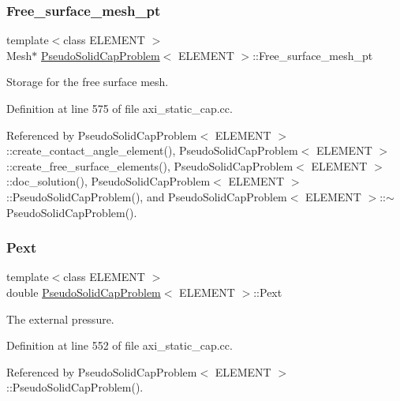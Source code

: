 \subsubsection{\texorpdfstring{Free\+\_\+surface\+\_\+mesh\+\_\+pt}{Free\_surface\_mesh\_pt}}
{\footnotesize\ttfamily template$<$class E\+L\+E\+M\+E\+NT $>$ \\
Mesh$\ast$ \hyperlink{classPseudoSolidCapProblem}{Pseudo\+Solid\+Cap\+Problem}$<$ E\+L\+E\+M\+E\+NT $>$\+::Free\+\_\+surface\+\_\+mesh\+\_\+pt\hspace{0.3cm}{\ttfamily [private]}}



Storage for the free surface mesh. 



Definition at line 575 of file axi\+\_\+static\+\_\+cap.\+cc.



Referenced by Pseudo\+Solid\+Cap\+Problem$<$ E\+L\+E\+M\+E\+N\+T $>$\+::create\+\_\+contact\+\_\+angle\+\_\+element(), Pseudo\+Solid\+Cap\+Problem$<$ E\+L\+E\+M\+E\+N\+T $>$\+::create\+\_\+free\+\_\+surface\+\_\+elements(), Pseudo\+Solid\+Cap\+Problem$<$ E\+L\+E\+M\+E\+N\+T $>$\+::doc\+\_\+solution(), Pseudo\+Solid\+Cap\+Problem$<$ E\+L\+E\+M\+E\+N\+T $>$\+::\+Pseudo\+Solid\+Cap\+Problem(), and Pseudo\+Solid\+Cap\+Problem$<$ E\+L\+E\+M\+E\+N\+T $>$\+::$\sim$\+Pseudo\+Solid\+Cap\+Problem().

\mbox{\label{classPseudoSolidCapProblem_afbcfe3a5a05d191c44815681e4b621d0}} 
\subsubsection{\texorpdfstring{Pext}{Pext}}
{\footnotesize\ttfamily template$<$class E\+L\+E\+M\+E\+NT $>$ \\
double \hyperlink{classPseudoSolidCapProblem}{Pseudo\+Solid\+Cap\+Problem}$<$ E\+L\+E\+M\+E\+NT $>$\+::Pext\hspace{0.3cm}{\ttfamily [private]}}



The external pressure. 



Definition at line 552 of file axi\+\_\+static\+\_\+cap.\+cc.



Referenced by Pseudo\+Solid\+Cap\+Problem$<$ E\+L\+E\+M\+E\+N\+T $>$\+::\+Pseudo\+Solid\+Cap\+Problem().

